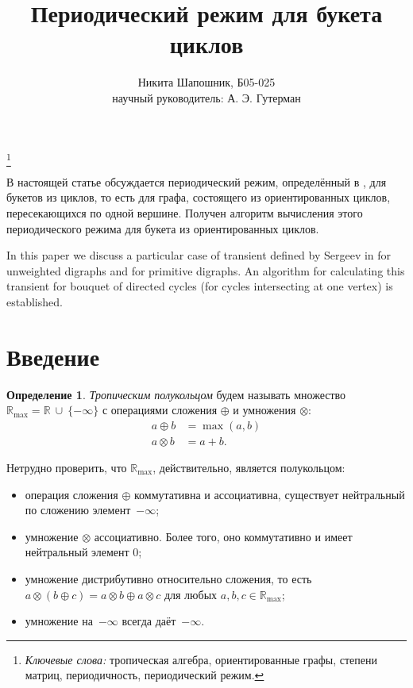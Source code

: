 \documentclass[12pt]{article}
\title{Периодический режим для букета циклов}
\author{Никита Шапошник, Б05-025\\ научный руководитель: А. Э. Гутерман}
\date{}
\theoremstyle{definition}
\newtheorem{definition}[theorem]{Определение}
\newcommand\blfootnote[1]{%
  \begingroup
  \renewcommand\thefootnote{}\footnote{#1}%
  \addtocounter{footnote}{-1}%
  \endgroup
}
\begin{document}
\maketitle

\blfootnote{\textit{Ключевые слова:} тропическая алгебра, ориентированные графы, степени матриц, периодичность, периодический режим.}

В настоящей статье обсуждается периодический режим, определённый в \cite{maxPlusAtWork}, для букетов из циклов, то есть для графа, состоящего из ориентированных циклов, пересекающихся по одной вершине. Получен алгоритм вычисления этого периодического режима для букета из ориентированных циклов.

In this paper we discuss a particular case of transient defined by Sergeev in \cite{maxAlgebraicPowers} for unweighted digraphs and for primitive digraphs. An algorithm for calculating this transient for bouquet of directed cycles (for cycles intersecting at one vertex) is established.

\section{Введение}
\label{definitions}
\begin{definition}
\textit{Тропическим полукольцом} будем называть множество $\mathbb{R}_{\max} = \mathbb{R} \ \cup ~\{-\infty\}$ с операциями сложения $\oplus$ и умножения $\otimes$: \begin{align*}
            a \oplus b &= \max(a, b)\\
            a \otimes b &= a + b.
        \end{align*}
\end{definition}

Нетрудно проверить, что $\mathbb{R}_{\max}$, действительно, является полукольцом:
\begin{itemize}
\item операция сложения $\oplus$ коммутативна и ассоциативна, существует нейтральный по сложению элемент~$-\infty$;
\item умножение $\otimes$ ассоциативно. Более того, оно коммутативно и имеет нейтральный элемент $0$;
\item умножение дистрибутивно относительно сложения, то есть $a \otimes (b \oplus c) = a \otimes b \oplus a \otimes c$ для любых $a, b, c \in \mathbb{R}_{\max}$;
\item умножение на~$-\infty$ всегда даёт~$-\infty$.
\end{itemize}
\end{document}
